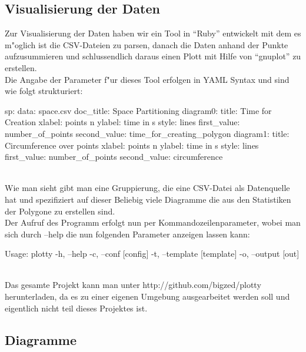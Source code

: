   \subsection{Visualisierung der Daten}
    Zur Visualisierung der Daten haben wir ein Tool in \enquote{Ruby} entwickelt
    mit dem es m"oglich ist die CSV-Dateien zu parsen, danach die Daten
    anhand der Punkte aufzusummieren und schlussendlich daraus einen Plott
    mit Hilfe von \enquote{gnuplot} zu erstellen.\\
    Die Angabe der Parameter f"ur dieses Tool erfolgen in YAML Syntax und
    sind wie folgt strukturiert:\\
        \begin{code}[caption={Plotkonfiguration},label=listing_plotconfiguration]
sp:
  data: space.csv
  doc_title: Space Partitioning
  diagram0:
    title: Time for Creation
    xlabel: points n
    ylabel: time in s
    style: lines
    first_value: number_of_points
    second_value: time_for_creating_polygon
  diagram1:
    title: Circumference over points
    xlabel: points n
    ylabel: time in s
    style: lines
    first_value: number_of_points
    second_value: circumference
    \end{code}\\
    Wie man sieht gibt man eine Gruppierung, die eine CSV-Datei als Datenquelle
    hat und spezifiziert auf dieser Beliebig viele Diagramme die 
    aus den Statistiken der Polygone zu erstellen sind.\\
    Der Aufruf des Programm erfolgt nun per Kommandozeilenparameter, wobei
    man sich durch --help die nun folgenden Parameter anzeigen lassen kann:\\
    \begin{code}[caption={Plottyparameter},label=listing_plottyparameter]
Usage: plotty
    -h, --help
    -c, --conf [config] 
    -t, --template [template]
    -o, --output [out]
    \end{code}\\
    Das gesamte Projekt kann man unter http://github.com/bigzed/plotty 
    herunterladen, da es zu einer eigenen Umgebung ausgearbeitet werden soll und
    eigentlich nicht teil dieses Projektes ist.
  \subsection{Diagramme}
